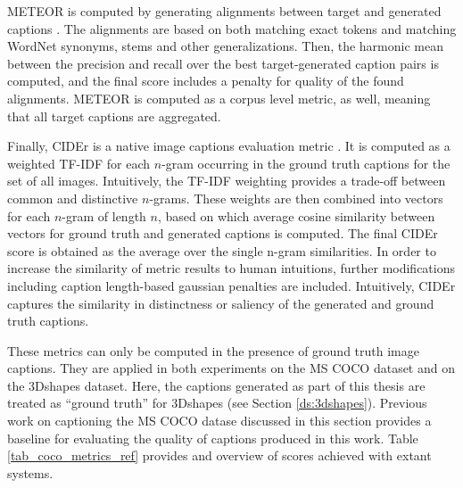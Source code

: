 
METEOR is computed by generating alignments between target and generated captions \parencite{banerjee2005meteor}. The alignments are based on both matching exact tokens and matching WordNet synonyms, stems and other generalizations. Then, the harmonic mean between the precision and recall over the best target-generated caption pairs is computed, and the final score includes a penalty for quality of the found alignments. METEOR is computed as a corpus level metric, as well, meaning that all target captions are aggregated.
 
Finally, CIDEr is a native image captions evaluation metric \parencite{vedantam2015cider}. It is computed as a weighted TF-IDF for each $n$-gram occurring in the ground truth captions for the set of all images. Intuitively, the TF-IDF weighting provides a trade-off between common and distinctive $n$-grams. These weights are then combined into vectors for each $n$-gram of length $n$, based on which average cosine similarity between vectors for ground truth and generated captions is computed. The final CIDEr score is obtained as the average over the single n-gram similarities. In order to increase the similarity of metric results to human intuitions, further modifications including caption length-based gaussian penalties are included. Intuitively, CIDEr captures the similarity in distinctness or saliency of the generated and ground truth captions.

These metrics can only be computed in the presence of ground truth image captions. They are applied in both experiments on the MS COCO dataset and on the 3Dshapes dataset. Here, the captions generated as part of this thesis are treated as ``ground truth'' for 3Dshapes (see Section \ref{ds:3dshapes}).
Previous work on captioning the MS COCO datase discussed in this section provides a baseline for evaluating the quality of captions produced in this work. Table \ref{tab_coco_metrics_ref} provides and overview of scores achieved with extant systems.

